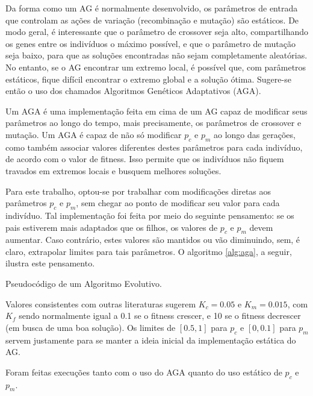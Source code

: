 Da forma como um AG é normalmente desenvolvido, os parâmetros de entrada que controlam as ações de variação (recombinação e mutação) são estáticos. De modo geral, é interessante que o parâmetro de crossover seja alto, compartilhando os genes entre os indivíduos o máximo possível, e que o parâmetro de mutação seja baixo, para que as soluções encontradas não sejam completamente aleatórias. No entanto, se o AG encontrar um extremo local, é possível que, com parâmetros estáticos, fique difícil encontrar o extremo global e a solução ótima. Sugere-se então o uso dos chamados Algoritmos Genéticos Adaptativos (AGA).

Um AGA é uma implementação feita em cima de um AG capaz de modificar seus parâmetros ao longo do tempo, mais precisamente, os parâmetros de crossover e mutação. Um AGA é capaz de não só modificar $p_c$ e $p_m$ ao longo das gerações, como também associar valores diferentes destes parâmetros para cada indivíduo, de acordo com o valor de fitness. Isso permite que os indivíduos não fiquem travados em extremos locais e busquem melhores soluções.

Para este trabalho, optou-se por trabalhar com modificações diretas aos parâmetros $p_c$ e $p_m$, sem chegar ao ponto de modificar seu valor para cada indivíduo. Tal implementação foi feita por meio do seguinte pensamento: se os pais estiverem mais adaptados que os filhos, os valores de $p_c$ e $p_m$ devem aumentar. Caso contrário, estes valores são mantidos ou vão diminuindo, sem, é claro, extrapolar limites para tais parâmetros. O algoritmo \ref{alg:aga}, a seguir, ilustra este pensamento.

\begin{algorithm}[H]
\caption{Pseudocódigo de um Algoritmo Evolutivo.}
\label{alg:aga}
\end{algorithm}

Valores consistentes com outras literaturas sugerem $K_c = 0.05$ e $K_m = 0.015$, com $K_f$ sendo normalmente igual a 0.1 se o fitness crescer, e 10 se o fitness decrescer (em busca de uma boa solução). Os limites de $[0.5, 1]$ para $p_c$ e $[0, 0.1]$ para $p_m$ servem justamente para se manter a ideia inicial da implementação estática do AG.

Foram feitas execuções tanto com o uso do AGA quanto do uso estático de $p_c$ e $p_m$.

